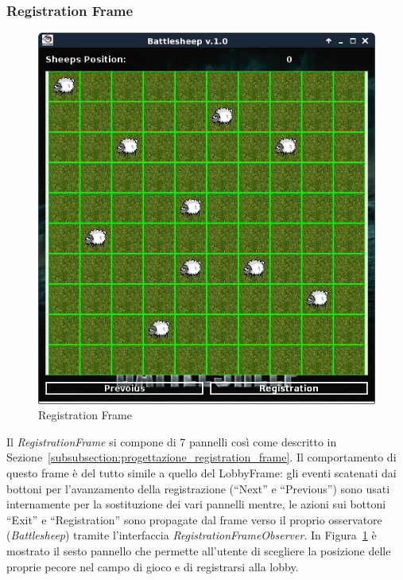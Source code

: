 \subsubsection{Registration Frame}
\begin{figure}[!h]
	\centering
	\includegraphics[scale=0.4]{core/imgs/gui/registration_frame}
	\caption{Registration Frame}
	\label{figure:registration_frame}
\end{figure}
Il \textit{RegistrationFrame} si compone di 7 pannelli così come descritto in
Sezione~\ref{subsubsection:progettazione_registration_frame}.\newline
Il comportamento di questo frame è del tutto simile a quello del LobbyFrame: gli
eventi scatenati dai bottoni per l'avanzamento della registrazione (``Next'' e
``Previous'') sono usati internamente per la sostituzione dei vari pannelli
mentre, le azioni sui bottoni ``Exit'' e ``Registration'' sono propagate dal
frame verso il proprio osservatore (\textit{Battlesheep}) tramite l'interfaccia
\textit{RegistrationFrameObserver}.\newline
In Figura~\ref{figure:registration_frame} è mostrato il sesto pannello che
permette all'utente di scegliere la posizione delle proprie pecore nel campo di
gioco e di registrarsi alla lobby.



